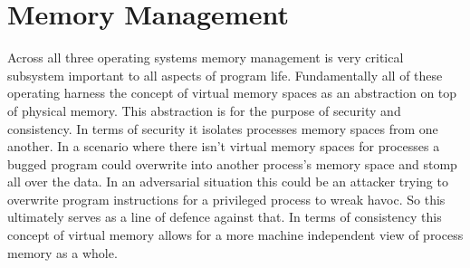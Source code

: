 \documentclass[letterpaper,10pt,draftclsnofoot,onecolumn]{IEEEtran}
\begin{document}
\section{Memory Management}
Across all three operating systems memory management is very critical subsystem important to all aspects of program life. Fundamentally all of these operating harness the concept of virtual memory spaces as an abstraction on top of physical memory. This abstraction is for the purpose of security and consistency. In terms of security it isolates processes memory spaces from one another. In a scenario where there isn’t virtual memory spaces for processes a bugged program could overwrite into another process's memory space and stomp all over the data. In an adversarial situation this could be an attacker trying to overwrite program instructions for a privileged process to wreak havoc. So this ultimately serves as a line of defence against that. In terms of consistency this concept of virtual memory allows for a more machine independent view of process memory as a whole.\\
\end{document}
